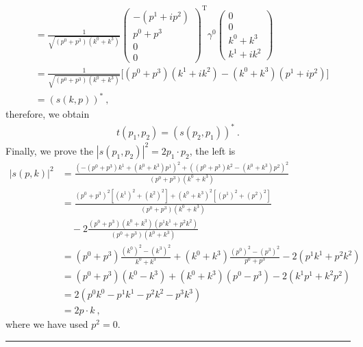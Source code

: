 \documentclass[12pt]{report}
\numberwithin{problemname}{chapter}
\newenvironment{solution}{\vspace{1em}\par\noindent{\large\textbf{\textsc{Solution}}}\par}{\vspace{1em}\hrule}
\begin{document}
\begin{solution}
\begin{enumerate}[(a)]
\begin{align}
        &=\frac{1}{\sqrt{(p^0+p^3)(k^0+k^3)}}
        \begin{pmatrix}
            -(p^1+ip^2) \\
            p^0+p^3 \\
            0 \\
            0
        \end{pmatrix}^\text{T}
        \gamma^0
        \begin{pmatrix}
            0 \\
            0 \\
            k^0+k^3 \\
            k^1+ik^2
        \end{pmatrix} \nonumber \\
        &=\frac{1}{\sqrt{(p^0+p^3)(k^0+k^3)}}\bigg[(p^0+p^3)(k^1+ik^2)-(k^0+k^3)(p^1+ip^2)\bigg] \nonumber \\
        &=(s(k,p))^* \ ,
    \end{align}
    therefore, we obtain
    \begin{align}
        t(p_1,p_2)=(s(p_2,p_1))^* \ .
    \end{align}
    Finally, we prove the $|s(p_1,p_2)|^2=2p_1\cdot p_2$, the left is
    \begin{align}
        |s(p,k)|^2&=\frac{(-(p^0+p^3)k^1+(k^0+k^3)p^1)^2+((p^0+p^3)k^2-(k^0+k^3)p^2)^2}{(p^0+p^3)(k^0+k^3)} \nonumber \\
        &=\frac{(p^0+p^3)^2[(k^1)^2+(k^2)^2]+(k^0+k^3)^2[(p^1)^2+(p^2)^2]}{(p^0+p^3)(k^0+k^3)} \nonumber \\
        &\quad -2\frac{(p^0+p^3)(k^0+k^3)(p^1k^1+p^2k^2)}{(p^0+p^3)(k^0+k^3)} \nonumber \\
        &=(p^0+p^3)\frac{(k^0)^2-(k^3)^2}{k^0+k^3}+(k^0+k^3)\frac{(p^0)^2-(p^3)^2}{p^0+p^3}-2(p^1k^1+p^2k^2) \nonumber \\
        &=(p^0+p^3)(k^0-k^3)+(k^0+k^3)(p^0-p^3)-2(k^1p^1+k^2p^2) \nonumber \\
        &=2(p^0k^0-p^1k^1-p^2k^2-p^3k^3) \nonumber \\
        &=2p\cdot k \ ,
    \end{align}
    where we have used $p^2=0$.
\end{enumerate}
\end{solution}
\end{document}
